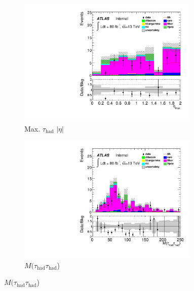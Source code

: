 \begin{figure}[htp]
\begin{subfigure}[b]{0.45\textwidth}
 \includegraphics[width=0.95\textwidth,angle=-90]{fig/OneL2taulowBDTOS/maxeta_F.pdf}
 \caption{Max. $\tau_{\text{had}}$ $|\eta|$}
\end{subfigure}
\begin{subfigure}[b]{0.45\textwidth}
 \includegraphics[width=0.95\textwidth,angle=-90]{fig/OneL2taulowBDTOS/mtautau_1l2tau_F.pdf}
 \caption{$M(\tau_{\text{had}}\tau_{\text{had}}$)}
\end{subfigure}
\end{figure}
